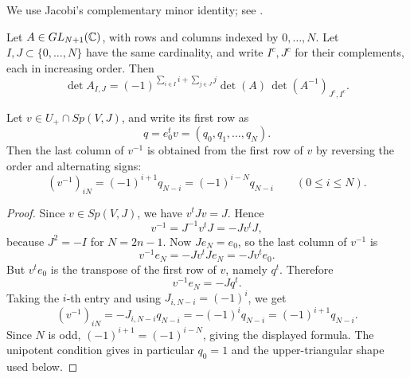 We use Jacobi's complementary minor identity; see \cite[Chapter I, \S4]{Gantmacher}.
\begin{lemma}\label{lem:jacobi-complementary-minor}
Let \(A\in GL_{N+1}(\mathbb{C})\), with rows and columns indexed by \(0,\ldots,N\). Let \(I,J\subset\{0,\ldots,N\}\) have the same cardinality, and write \(I^c,J^c\) for their complements, each in increasing order. Then
\[
\det A_{I,J}
=
(-1)^{\sum_{i\in I}i+\sum_{j\in J}j}
\det(A)\,
\det (A^{-1})_{J^c,I^c}.
\]
\end{lemma}

\begin{lemma}\label{lem:symplectic-inverse-last-column}
Let \(v\in U_+\cap Sp(V,J)\), and write its first row as
\[
q=e_0^tv=(q_0,q_1,\ldots,q_N).
\]
Then the last column of \(v^{-1}\) is obtained from the first row of \(v\) by reversing the order and alternating signs:
\[
(v^{-1})_{iN}=(-1)^{i+1}q_{N-i}=(-1)^{i-N}q_{N-i}
\qquad(0\le i\le N).
\]
\end{lemma}

\begin{proof}
Since \(v\in Sp(V,J)\), we have \(v^tJv=J\). Hence
\[
v^{-1}=J^{-1}v^tJ=-Jv^tJ,
\]
because \(J^2=-I\) for \(N=2n-1\). Now \(Je_N=e_0\), so the last column of \(v^{-1}\) is
\[
v^{-1}e_N=-Jv^tJe_N=-Jv^te_0.
\]
But \(v^te_0\) is the transpose of the first row of \(v\), namely \(q^t\). Therefore
\[
v^{-1}e_N=-Jq^t.
\]
Taking the \(i\)-th entry and using \(J_{i,N-i}=(-1)^i\), we get
\[
(v^{-1})_{iN}
=
-J_{i,N-i}q_{N-i}
=
-(-1)^iq_{N-i}
=
(-1)^{i+1}q_{N-i}.
\]
Since \(N\) is odd, \((-1)^{i+1}=(-1)^{i-N}\), giving the displayed formula. The unipotent condition gives in particular \(q_0=1\) and the upper-triangular shape used below.
\end{proof}


